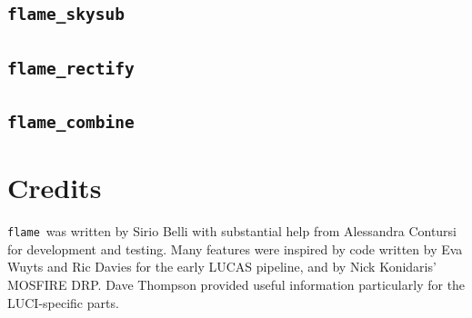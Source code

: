 \documentclass[a4paper, notitlepage]{article}
\newcommand{\flame}{\texttt{flame}}
\begin{document}
\subsection{\texttt{flame\_skysub}}




\subsection{\texttt{flame\_rectify}}




\subsection{\texttt{flame\_combine}}





\vspace{10mm}

\section*{Credits}

\flame\ was written by Sirio Belli with substantial help from Alessandra Contursi for development and testing. Many features were inspired by code written by Eva Wuyts and Ric Davies for the early LUCAS pipeline, and by Nick Konidaris' MOSFIRE DRP. Dave Thompson provided useful information particularly for the LUCI-specific parts.
\end{document}
